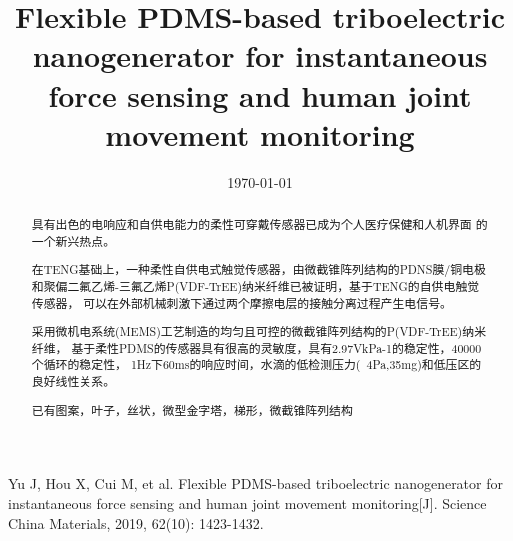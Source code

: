 \documentclass[UTF8]{ctexart}       %
\begin{document}
\title{Flexible PDMS-based triboelectric nanogenerator for instantaneous force sensing and human joint movement monitoring}
\date{\today}
\maketitle



\begin{abstract}

    具有出色的电响应和自供电能力的柔性可穿戴传感器已成为个人医疗保健和人机界面
的一个新兴热点。

    在TENG基础上，一种柔性自供电式触觉传感器，由微截锥阵列结构的PDNS膜/铜电极
和聚偏二氟乙烯-三氟乙烯P(VDF-TrEE)纳米纤维已被证明，基于TENG的自供电触觉传感器，
可以在外部机械刺激下通过两个摩擦电层的接触分离过程产生电信号。

    采用微机电系统(MEMS)工艺制造的均匀且可控的微截锥阵列结构的P(VDF-TrEE)纳米纤维， 
基于柔性PDMS的传感器具有很高的灵敏度，具有2.97VkPa-1的稳定性，40000个循环的稳定性，
1Hz下60ms的响应时间，水滴的低检测压力(~4Pa,35mg)和低压区的良好线性关系。

    已有图案，叶子，丝状，微型金字塔，梯形，微截锥阵列结构

\end{abstract}

\tableofcontents %


\clearpage


\clearpage





\begin{thebibliography}{99}   %
     Yu J, Hou X, Cui M, et al. Flexible PDMS-based triboelectric nanogenerator for instantaneous force sensing and human joint movement monitoring[J]. Science China Materials, 2019, 62(10): 1423-1432.




\end{thebibliography}
\end{document}
